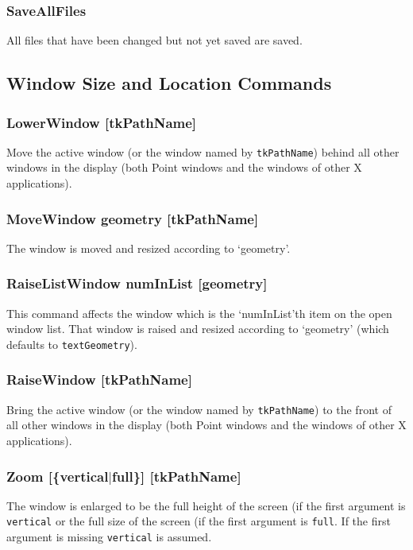 \subsubsection{SaveAllFiles}
All files that have been changed but not yet saved are saved.





\subsection{Window Size and Location Commands}

\subsubsection{LowerWindow [tkPathName]}
Move the active window (or the window named by {\tt tkPathName})
behind all other windows in the display
(both Point windows and the windows of other X applications).

\subsubsection{MoveWindow geometry [tkPathName]}
The window is moved and resized according to `geometry'.

\subsubsection{RaiseListWindow numInList [geometry]}
This command affects the window which is the `numInList'th
item on the open window list.
That window is raised and resized according to `geometry'
(which defaults to {\tt textGeometry}).

\subsubsection{RaiseWindow [tkPathName]}
Bring the active window (or the window named by {\tt tkPathName})
to the front of all other windows in the display
(both Point windows and the windows of other X applications).

\subsubsection{Zoom [\{vertical$\mid$full\}] [tkPathName]}
The window is enlarged to be the full height of the screen
(if the first argument is {\tt vertical}
or the full size of the screen (if the first argument is {\tt full}.
If the first argument is missing {\tt vertical} is assumed.





